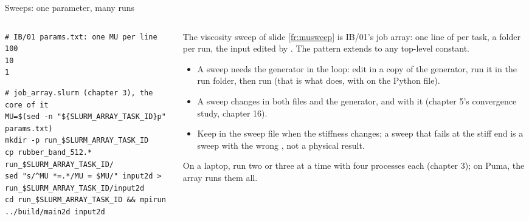 \documentclass[aspectratio=169,11pt]{beamer}
\begin{document}
\begin{frame}[fragile]{Sweeps: one parameter, many runs}
\label{fr:sweep}
\begin{columns}[T,onlytextwidth]
\begin{column}{0.46\textwidth}
\begin{lstlisting}[style=data]
# IB/01 params.txt: one MU per line
100
10
1
\end{lstlisting}
\begin{lstlisting}[style=shell]
# job_array.slurm (chapter 3), the core of it
MU=$(sed -n "${SLURM_ARRAY_TASK_ID}p" params.txt)
mkdir -p run_$SLURM_ARRAY_TASK_ID
cp rubber_band_512.* run_$SLURM_ARRAY_TASK_ID/
sed "s/^MU *=.*/MU = $MU/" input2d > run_$SLURM_ARRAY_TASK_ID/input2d
cd run_$SLURM_ARRAY_TASK_ID && mpirun ../build/main2d input2d
\end{lstlisting}
\end{column}
\begin{column}{0.52\textwidth}
\footnotesize The viscosity sweep of slide \ref{fr:musweep} is IB/01's job array: one line of  per task, a folder per run, the input edited by . The pattern extends to any top-level constant.
\begin{itemize}
  \item A  sweep needs the generator in the loop: edit  in a copy of the generator, run it in the run folder, then run (that is what  does, with  on the Python file).
  \item A  sweep changes  in both files and the generator, and  with it (chapter 5's convergence study, chapter 16).
  \item Keep  in the sweep file when the stiffness changes; a sweep that fails at the stiff end is a sweep with the wrong , not a physical result.
\end{itemize}
\footnotesize On a laptop, run two or three at a time with four processes each (chapter 3); on Puma, the array runs them all.
\end{column}
\end{columns}
\end{frame}
\end{document}
